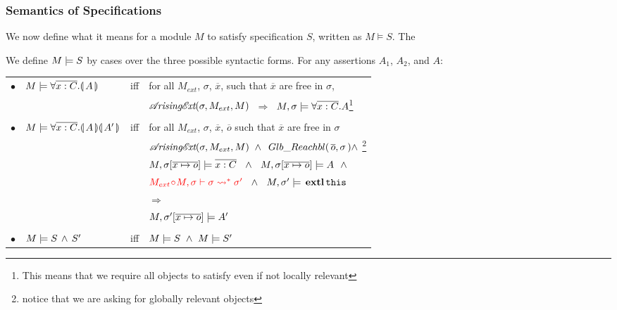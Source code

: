  
 \subsubsection{ Semantics of \SpecLang Specifications}
We now  define what it means for  a module  $M$ to satisfy specification  $S$, written as $M \vDash S$. The
 
\begin{definition}%

We define $M \models {S}$ by cases over the three possible syntactic forms.
For any assertions   $A_1$, $A_2$, and $A$: \\

\label{def:necessity-semantics}

\begin{tabular}{l l c l }

$\bullet$ & $M \models \forall {\overline {x:C}}.{\llparenthesis}\, A \,{\rrparenthesis} 	$& iff & 
for all $M_{ext}$, $\sigma$, $\overline{x}$, such that $\overline{x}$  are free in $\sigma$, \\
  & & & $ \mathcal{A}\!\textit{rising}{\mathcal{E}\!\textit{xt}(\sigma, M_{ext}, M)}$ %
$ \ \Longrightarrow \  $  %
{$ M , \sigma \models \forall \overline{x:C}.A$}\footnote{{This means that we require all objects to satisfy even if not locally relevant}}
\\
\\
$\bullet$ & $M \models \forall {\overline {x:C}}.{\llparenthesis}\, A \,{\rrparenthesis}{\llparenthesis}\, A' \,{\rrparenthesis}$& iff & 
for all $M_{ext}$, $\sigma$, $\overline{x}$, $\overline{o}$ such that $\overline{x}$  are free in $\sigma$  \\
& & &
${\extArising{\sigma}{M_{ext}}{M}} \ \wedge\  \GRelevant {\overline o}  \sigma \wedge \ $\footnote{{notice that we are asking for globally relevant objects}}\\
& & & $ \satisfiesA{M}{\sigma[\overline{x\mapsto o}]}{\overline {x:C}}  \ \ \wedge\ \  \satisfiesA{M}{\sigma[\overline{x\mapsto o}]}{A} \ \ \wedge$ \\ 
& & &
$\color{red}M_{ext}\!\circ \!M, \sigma \vdash {\sigma} \leadsto^* \sigma'  \color{black} \ \ \wedge\ \  M, \sigma' \models {{\ensuremath{\, \mathbf{extl}}\, {\texttt{this}}\, }}$ \\
& & & $ \Longrightarrow $ \\
& & & $ M , \sigma'[\overline{x\mapsto o}] \models A' $
\\
\\
$\bullet$ &  $M \models S\, \wedge\, S'$ &   iff   & $\satisfies{M}{S}\ \wedge \ \satisfies{M}{S'}$
\end{tabular} 

 
\end{definition} 


